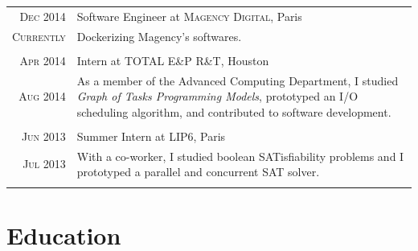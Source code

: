 \documentclass[a4paper,10pt]{article} %
\begin{document}
\begin{tabular}{r|p{11cm}}

\textsc{Dec 2014} & Software Engineer at \textsc{Magency Digital}, Paris\\
\textsc{Currently} & \footnotesize{
						Dockerizing Magency's softwares.
					}\\
\multicolumn{2}{c}{} \\


\textsc{Apr 2014} & Intern at \textsc{TOTAL E\&P R\&T}, Houston\\
\textsc{Aug 2014} & \footnotesize{
						As a member of the Advanced Computing Department, I studied \emph{Graph of Tasks Programming Models}, prototyped an I/O scheduling algorithm, and contributed to software development.
					}\\
\multicolumn{2}{c}{} \\


\textsc{Jun 2013} & Summer Intern at \textsc{LIP6}, Paris\\
\textsc{Jul 2013} & \footnotesize{
						With a co-worker, I studied boolean SATisfiability problems and I prototyped a parallel and concurrent SAT solver.
					}\\
\multicolumn{2}{c}{} \\

\end{tabular}


\section{Education}
\end{document}
